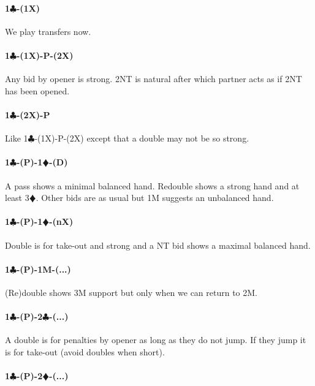 \documentclass[a4paper]{article}
\newcommand{\BC}{\textcolor{OliveGreen}{$\clubsuit$}}
\newcommand{\BD}{\textcolor{RedOrange}{$\vardiamondsuit$}}
\newcommand{\pdfc}{\texorpdfstring{\BC{}}{C}}
\newcommand{\pdfd}{\texorpdfstring{\BD{}}{D}}
\begin{document}
\paragraph{1\pdfc-(1X)}

We play transfers now.
\bigbreak
\paragraph{1\pdfc-(1X)-P-(2X)}

Any bid by opener is strong. 2NT is natural after which partner acts as if 2NT has been opened.
\bigbreak
\paragraph{1\pdfc-(2X)-P}

Like 1\BC -(1X)-P-(2X) except that a double may not be so strong.
\bigbreak
\paragraph{1\pdfc-(P)-1\pdfd-(D)}

A pass shows a minimal balanced hand. Redouble shows a strong hand and at
least 3\BD . Other bids are as usual but 1M suggests an unbalanced hand.
\bigbreak
\paragraph{1\pdfc-(P)-1\pdfd-(nX)}

Double is for take-out and strong and a NT bid shows a maximal balanced hand.
\bigbreak
\paragraph{1\pdfc-(P)-1M-(...)}

(Re)double shows 3M support but only when we can return to 2M.
\bigbreak
\paragraph{1\pdfc-(P)-2\pdfc-(...)}

A double is for penalties by opener as long as they do not jump. If they jump
it is for take-out (avoid doubles when short).
\bigbreak
\paragraph{1\pdfc-(P)-2\pdfd-(...)}
\end{document}

